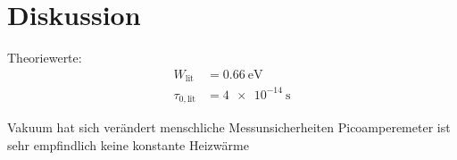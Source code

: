 \section{Diskussion}
\label{sec:Diskussion}

Theoriewerte\cite{RMucillo}: 
\begin{align*}
    W_\text{lit}&= \qty{0.66}{\electronvolt}\\
    \tau_{0,\text{lit}}&= \qty{4e-14}{\second} 
\end{align*}

Vakuum hat sich verändert
menschliche Messunsicherheiten
Picoamperemeter ist sehr empfindlich
keine konstante Heizwärme